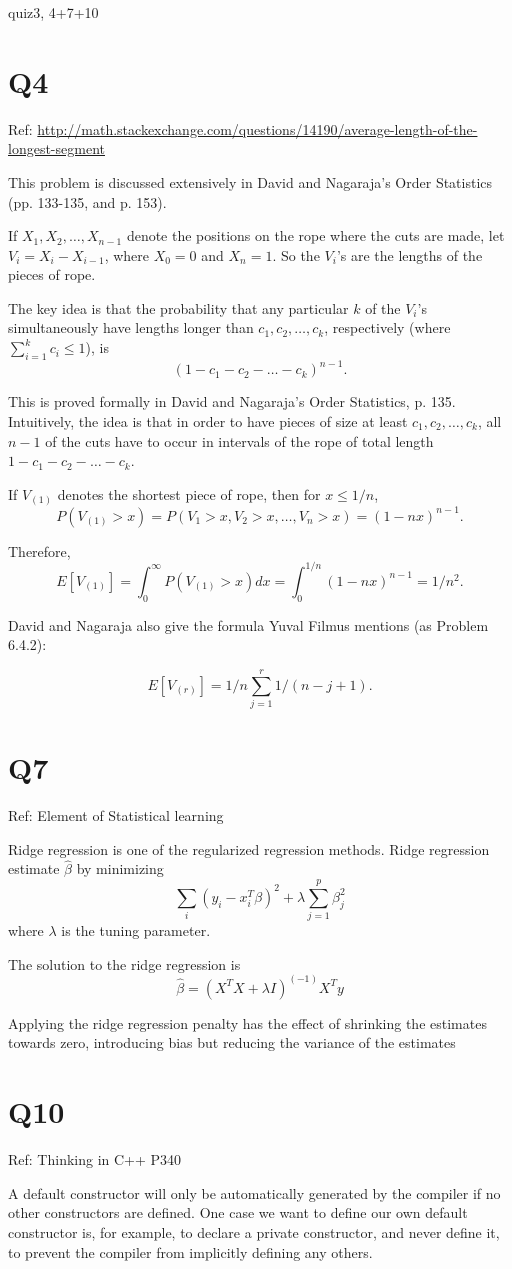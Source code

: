 \documentclass{article}
\begin{document}
quiz3, 4+7+10

\section{Q4}
Ref: \url{http://math.stackexchange.com/questions/14190/average-length-of-the-longest-segment}

This problem is discussed extensively in David and Nagaraja's Order Statistics (pp. 133-135, and p. 153).

If $X_1,X_2,…,X_{n−1}$ denote the positions on the rope where the cuts are made, let $V_i=X_i−X_{i−1}$, where $X_0=0$ and $X_n=1$. So the $V_i$'s are the lengths of the pieces of rope.

The key idea is that the probability that any particular $k$ of the $V_i$'s simultaneously have lengths longer than $c_1,c_2,…,c_k$, respectively (where $\sum^k_{i=1}c_i \le 1$), is
$$(1−c_1−c_2− \ldots −c_k)^{n−1}.$$

This is proved formally in David and Nagaraja's Order Statistics, p. 135. Intuitively, the idea is that in order to have pieces of size at least $c_1,c_2,…,c_k$, all $n−1$ of the cuts have to occur in intervals of the rope of total length $1−c_1−c_2− \ldots −c_k$.

If $V_{(1)}$ denotes the shortest piece of rope, then for $x\le 1/n$,
$$P(V_{(1)}>x)=P(V_1>x,V_2>x,…,V_n>x)=(1−nx)^{n−1}.$$

Therefore,
$$E[V_{(1)}]=\int_0^{\infty} P(V_{(1)}>x)dx=\int^{1/n}_0(1−nx)^{n−1}=1/n^2.$$

David and Nagaraja also give the formula Yuval Filmus mentions (as Problem 6.4.2):

$$E[V_{(r)}]=1/n \sum_{j=1}^r 1/(n−j+1).$$

\section{Q7}
Ref: Element of Statistical learning

Ridge regression is one of the regularized  regression methods. Ridge regression estimate $\hat{\beta}$ by minimizing
$$
\sum_i (y_i-x_i^T\beta)^2 + \lambda \sum_{j=1}^p \beta_j^2
$$
where $\lambda$ is the tuning parameter.

The solution to the ridge regression is 
$$
\hat{\beta} = (X^TX + \lambda I)^(-1)X^Ty
$$

Applying the ridge regression penalty has the effect of shrinking the estimates towards zero, introducing bias but reducing the variance of the estimates

\section{Q10}
Ref: Thinking in C++ P340

A default constructor will only be automatically generated by the compiler if no other constructors are defined.  One case we want to define our own default constructor is,  for example, to declare a private constructor, and never define it, to prevent the compiler from implicitly defining any others.
\end{document}
